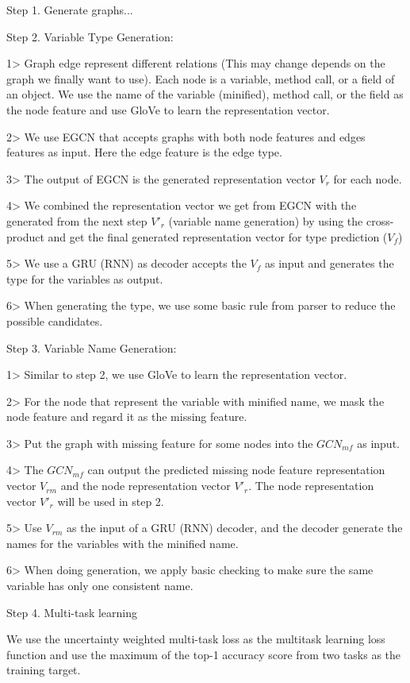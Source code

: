 Step 1. Generate graphs...

Step 2. Variable Type Generation:

1> Graph edge represent different relations (This may change depends on the graph we finally want to use). Each node is a variable, method call, or a field of an object. We use the name of the variable (minified), method call, or the field as the node feature and use GloVe to learn the representation vector.

2> We use EGCN that accepts graphs with both node features and edges features as input. Here the edge feature is the edge type. 

3> The output of EGCN is the generated representation vector $V_r$ for each node. 

4> We combined the representation vector we get from EGCN with the generated from the next step $V'_r$ (variable name generation) by using the cross-product and get the final generated representation vector for type prediction ($V_f$)

5> We use a GRU (RNN) as decoder accepts the $V_f$ as input and generates the type for the variables as output.

6> When generating the type, we use some basic rule from parser to reduce the possible candidates.

Step 3. Variable Name Generation:

1> Similar to step 2, we use GloVe to learn the representation vector.

2> For the node that represent the variable with minified name, we mask the node feature and regard it as the missing feature.

3> Put the graph with missing feature for some nodes into the $GCN_{mf}$ as input. 

4> The $GCN_{mf}$ can output the predicted missing node feature representation vector $V_{rm}$ and the node representation vector $V'_r$. The node representation vector $V'_r$ will be used in step 2.

5> Use $V_{rm}$ as the input of a GRU (RNN) decoder, and the decoder generate the names for the variables with the minified name.

6> When doing generation, we apply basic checking to make sure the same variable has only one consistent name.

Step 4. Multi-task learning

We use the uncertainty weighted multi-task loss as the multitask learning loss function and use the maximum of the top-1 accuracy score from two tasks as the training target.
 

